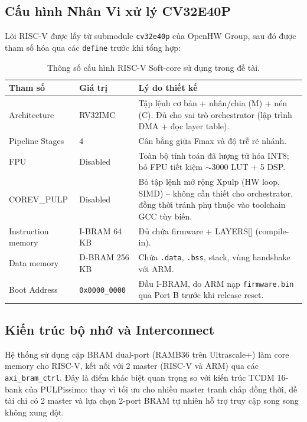 \subsection{Cấu hình Nhân Vi xử lý CV32E40P}
\label{ssec:riscv_config}
Lõi RISC-V được lấy từ submodule \texttt{cv32e40p} của OpenHW Group, sau đó được tham số hóa qua các \texttt{define} trước khi tổng hợp:

\begin{table}[h]
\centering
\caption{Thông số cấu hình RISC-V Soft-core sử dụng trong đề tài.}
\label{tab:riscv_config}
\begin{tabular}{|l|l|p{6.5cm}|}
\hline
\textbf{Tham số} & \textbf{Giá trị} & \textbf{Lý do thiết kế} \\ \hline
Architecture       & RV32IMC                & Tập lệnh cơ bản + nhân/chia (M) + nén (C). Đủ cho vai trò orchestrator (lập trình DMA + đọc layer table). \\ \hline
Pipeline Stages    & 4                      & Cân bằng giữa Fmax và độ trễ rẽ nhánh. \\ \hline
FPU                & Disabled               & Toàn bộ tính toán đã lượng tử hóa INT8; bỏ FPU tiết kiệm $\sim$3000 LUT + 5 DSP. \\ \hline
COREV\_PULP        & Disabled               & Bỏ tập lệnh mở rộng Xpulp (HW loop, SIMD) -- không cần thiết cho orchestrator, đồng thời tránh phụ thuộc vào toolchain GCC tùy biến. \\ \hline
Instruction memory & I-BRAM 64 KB           & Đủ chứa firmware + LAYERS[] (compile-in). \\ \hline
Data memory        & D-BRAM 256 KB          & Chứa \texttt{.data}, \texttt{.bss}, stack, vùng handshake với ARM. \\ \hline
Boot Address       & \texttt{0x0000\_0000}  & Đầu I-BRAM, do ARM nạp \texttt{firmware.bin} qua Port B trước khi release reset. \\ \hline
\end{tabular}
\end{table}

\subsection{Kiến trúc bộ nhớ và Interconnect}
\label{ssec:bram_interconnect}
Hệ thống sử dụng cặp BRAM dual-port (RAMB36 trên Ultrascale+) làm core memory cho RISC-V, kết nối với 2 master (RISC-V và ARM) qua các \texttt{axi\_bram\_ctrl}. Đây là điểm khác biệt quan trọng so với kiến trúc TCDM 16-bank của PULPissimo: thay vì tối ưu cho nhiều master tranh chấp đồng thời, đề tài chỉ có 2 master và lựa chọn 2-port BRAM tự nhiên hỗ trợ truy cập song song không xung đột.


